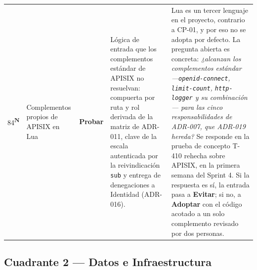 \documentclass[11pt,a4paper]{article}
\newcommand{\adoptar}{\textcolor{ringAdoptar}{\textbf{Adoptar}}}
\newcommand{\probar}{\textcolor{ringProbar}{\textbf{Probar}}}
\newcommand{\evitar}{\textcolor{ringEvitar}{\textbf{Evitar}}}
\newcommand{\nueva}{\textsuperscript{\textcolor{vinotinto}{\scriptsize\bfseries N}}}
\begin{document}
\begin{longtable}{L{0.8cm} L{2.6cm} L{1.6cm} L{4.1cm} L{4.5cm}}
84\nueva & Complementos propios de APISIX en Lua & \probar{} & Lógica de entrada que los complementos estándar de APISIX no resuelvan: compuerta por ruta y rol derivada de la matriz de ADR-011, clave de la escala autenticada por la reivindicación \texttt{sub} y entrega de denegaciones a Identidad (ADR-016). & Lua es un tercer lenguaje en el proyecto, contrario a CP-01, y por eso no se adopta por defecto. La pregunta abierta es concreta: \emph{¿alcanzan los complementos estándar ---\texttt{openid-connect}, \texttt{limit-count}, \texttt{http-logger} y su combinación--- para las cinco responsabilidades de ADR-007, que ADR-019 hereda?} Se responde en la prueba de concepto T-410 rehecha sobre APISIX, en la primera semana del Sprint 4. Si la respuesta es sí, la entrada pasa a \evitar{}; si no, a \adoptar{} con el código acotado a un solo complemento revisado por dos personas. \\

\end{longtable}

\subsection{Cuadrante 2 — Datos e Infraestructura}
\label{sec:q2}
\end{document}
